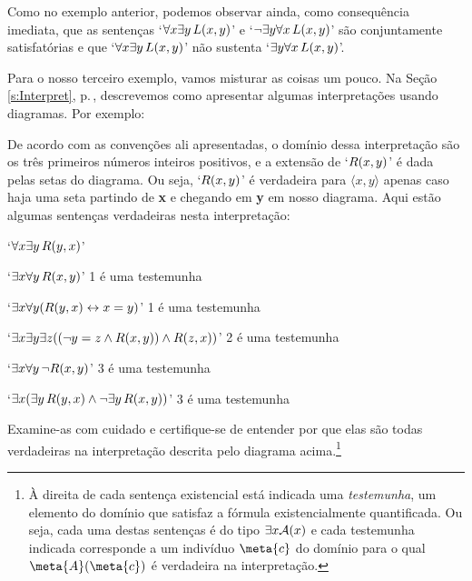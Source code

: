 Como no exemplo anterior, podemos observar ainda, como consequência imediata, que as sentenças `$\forall x \exists y\, \mathord{L}(x,y)$' e `$\neg\exists y \forall x\, \mathord{L}(x,y)$' são conjuntamente satisfatórias e que `$\forall x \exists y\, \mathord{L}(x,y)$' não sustenta `$\exists y \forall x\, \mathord{L}(x,y)$'.

Para o nosso terceiro exemplo, vamos misturar as coisas um pouco.
Na Seção \ref{s:Interpret}, p.\,\pageref{s:Interpret}, descrevemos como apresentar algumas interpretações usando diagramas. Por exemplo:
\begin{center}
\end{center}
De acordo com as convenções ali apresentadas, o domínio dessa interpretação são os três primeiros números inteiros positivos, e a extensão de  `$\mathord{R}(x,y)$' é dada pelas setas do diagrama.
Ou seja, `$\mathord{R}(x,y)$' é verdadeira para $\langle x, y \rangle$ apenas caso haja uma seta partindo  de \textbf{x} e chegando em \textbf{y} em nosso diagrama.
Aqui estão algumas sentenças verdadeiras nesta interpretação:
	\begin{ebullet}
		\item `$\forall x \exists y\, \mathord{R}(y,x)$' 
		\item `$\exists x \forall y\, \mathord{R}(x,y)$' \hfill  {\footnotesize 1 é uma testemunha}
		\item `$\exists x \forall y (\mathord{R}(y,x) \leftrightarrow x = y)$' \hfill {\footnotesize 1 é uma testemunha}
		\item `$\exists x \exists y \exists z ((\neg y = z \wedge \mathord{R}(x,y)) \wedge \mathord{R}(z,x))$' \hfill {\footnotesize 2 é uma testemunha}
		\item `$\exists x \forall y\, \neg \mathord{R}(x,y)$' \hfill {\footnotesize 3 é uma testemunha}
		\item `$\exists x (\exists y\, \mathord{R}(y,x) \wedge \neg \exists y\, \mathord{R}(x,y))$' \hfill {\footnotesize 3 é uma testemunha}
	\end{ebullet}
Examine-as com cuidado e certifique-se de entender por que elas são todas verdadeiras na interpretação descrita pelo diagrama acima.\footnote{
	À direita de cada sentença existencial está indicada uma \textit{testemunha}, um elemento do domínio que satisfaz a fórmula existencialmente quantificada.
	Ou seja, cada uma destas sentenças é do tipo $\exists x \mathord{\mathcal{A}}(x)$ e cada testemunha indicada corresponde a um indivíduo $\meta{c}$ do domínio para o qual $\atom{\meta{A}}{\meta{c}}$ é verdadeira na interpretação.}	
	
